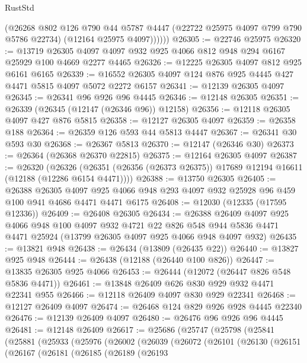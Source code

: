 \begin{lexlean}{RustStd}
\begin{coremodule}
            (@26268
              @802
              @126
              @790
              @44
              @5787
              @4447
              (@22722 @25975 @4097 @799 @790 @5786 @22734)
              (@12164 @25975 @4097))))))
@26305 := @22746 @25975
@26320 := @13719
    @26305
    @4097
    @4097
    @932
    @925
    @4066
    @812
    @948
    @294
    @6167
    @25929
    @100
    @4669
    @2277
    @4465
@26326 := @12225 @26305 @4097 @812 @925 @6161 @6165
@26339 := @16552 @26305 @4097 @124 @876 @925 @4445 @427 @4471 @5815 @4097 @5072 @2272 @6157
@26341 := @12139 @26305 @4097
@26345 := @26341 @96 @926 @96 @4445
@26346 := @12148 @26305
@26351 := @26339 (@26345 (@12147 (@26346 @96)) @12158)
@26356 := @12118 @26305 @4097 @427 @876 @5815
@26358 := @12127 @26305 @4097
@26359 := @26358 @188
@26364 := @26359 @126 @593 @44 @5813 @4447
@26367 := @26341 @30 @593 @30
@26368 := @26367 @5813
@26370 := @12147 (@26346 @30)
@26373 := @26364 (@26368 @26370 @22815)
@26375 := @12164 @26305 @4097
@26387 := @26320
    (@26326 (@26351 (@26356 (@26373 @26375)) @17689 @12194 @16611 (@12188 (@12286 @6154 @4471))))
@26388 := @13750 @26305
@26405 := @26388
    @26305
    @4097
    @925
    @4066
    @948
    @293
    @4097
    @932
    @25928
    @96
    @459
    @100
    @941
    @4686
    @4471
    @4471
    @6175
@26408 := @12030 (@12335 (@17595 @12336))
@26409 := @26408 @26305
@26434 := @26388
    @26409
    @4097
    @925
    @4066
    @948
    @100
    @4097
    @932
    @4721
    @22
    @826
    @548
    @944
    @5836
    @4471
    @4471
    @25924
    (@13799 @26305 @4097 @925 @4066 @948 @4097 @932)
@26435 := @13821 @948
@26438 := @26434 (@13809 (@26435 @22))
@26440 := @13827 @925 @948
@26444 := @26438 (@12188 (@26440 @100 @826))
@26447 := @13835 @26305 @925 @4066
@26453 := @26444 (@12072 (@26447 @826 @548 @5836 @4471))
@26461 := @13848 @26409 @626 @830 @929 @932 @4471 @22341 @955
@26466 := @12118 @26409 @4097 @830 @929 @22341
@26468 := @12127 @26409 @4097
@26474 := @26468 @124 @829 @926 @928 @4445 @22340
@26476 := @12139 @26409 @4097
@26480 := @26476 @96 @926 @96 @4445
@26481 := @12148 @26409
@26617 := @25686
    (@25747
      (@25798
        (@25841
          (@25881
            (@25933
              (@25976
                (@26002
                  (@26039
                    (@26072
                      (@26101
                        (@26130
                          (@26151
                            (@26167
                              (@26181
                                (@26185
                                  (@26189
                                    (@26193

\end{coremodule}
\end{lexlean}
